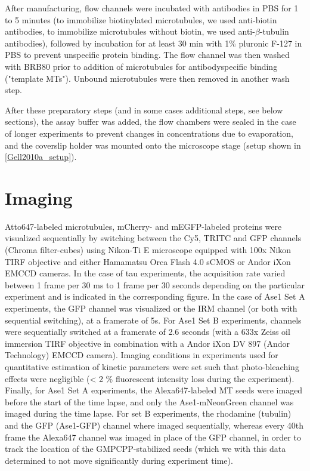 After manufacturing, flow channels were incubated with antibodies in PBS for 1 to 5 minutes (to immobilize biotinylated microtubules, we used anti-biotin antibodies, to immobilize microtubules without biotin, we used anti-$\beta$-tubulin antibodies), followed by incubation for at least 30 min with 1\% pluronic F-127 in PBS to prevent unspecific protein binding. The flow channel was then washed with BRB80 prior to addition of microtubules for antibodyspecific binding ("template MTs"). Unbound microtubules were then removed in another wash step.\par
After these preparatory steps (and in some cases additional steps, see below sections), the assay buffer was added, the flow chambers were sealed in the case of longer experiments to prevent changes in concentrations due to evaporation, and the coverslip holder was mounted onto the microscope stage (setup shown in \autoref{Gell2010a_setup}).

\section{Imaging}
Atto647-labeled microtubules, mCherry- and mEGFP-labeled proteins were visualized sequentially by switching between the Cy5, TRITC and GFP channels (Chroma filter-cubes) using Nikon-Ti E microscope equipped with 100x Nikon TIRF objective and either Hamamatsu Orca Flash 4.0 sCMOS or Andor iXon EMCCD cameras. In the case of tau experiments, the acquisition rate varied between 1 frame per 30 ms to 1 frame per 30 seconds depending on the particular experiment and is indicated in the corresponding figure. In the case of Ase1 Set A experiments, the GFP channel was visualized or the IRM channel (or both with sequential switching), at a framerate of 5s. For Ase1 Set B experiments, channels were sequentially switched at a framerate of 2.6 seconds (with a 633x Zeiss oil immersion TIRF objective in combination with a Andor iXon DV 897 (Andor Technology) EMCCD camera). Imaging conditions in experiments used for quantitative estimation of kinetic parameters were set such that photo-bleaching effects were negligible (< 2 \% fluorescent intensity loss during the experiment). Finally, for Ase1 Set A experiments, the Alexa647-labeled MT seeds were imaged before the start of the time lapse, and only the Ase1-mNeonGreen channel was imaged during the time lapse. For set B experiments, the rhodamine (tubulin) and the GFP (Ase1-GFP) channel where imaged sequentially, whereas every 40th frame the Alexa647 channel was imaged in place of the GFP channel, in order to track the location of the GMPCPP-stabilized seeds (which we with this data determined to not move significantly during experiment time). 

